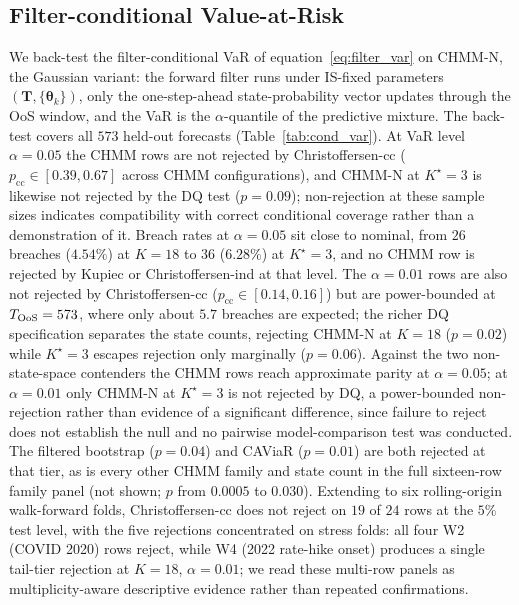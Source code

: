 \subsection{Filter-conditional Value-at-Risk}
\label{sec:res_var}

We back-test the filter-conditional VaR of equation~\eqref{eq:filter_var} on CHMM-N, the Gaussian variant: the forward filter runs under IS-fixed parameters $(\mathbf T, \{\boldsymbol\theta_k\})$, only the one-step-ahead state-probability vector updates through the OoS window, and the VaR is the $\alpha$-quantile of the predictive mixture. The back-test covers all $573$ held-out forecasts (Table~\ref{tab:cond_var}). At VaR level $\alpha = 0.05$ the CHMM rows are not rejected by Christoffersen-cc ($p_{\text{cc}} \in [0.39, 0.67]$ across CHMM configurations), and CHMM-N at $K^\star = 3$ is likewise not rejected by the DQ test ($p = 0.09$); non-rejection at these sample sizes indicates compatibility with correct conditional coverage rather than a demonstration of it. Breach rates at $\alpha = 0.05$ sit close to nominal, from $26$ breaches ($4.54\%$) at $K = 18$ to $36$ ($6.28\%$) at $K^\star = 3$, and no CHMM row is rejected by Kupiec or Christoffersen-ind at that level. The $\alpha = 0.01$ rows are also not rejected by Christoffersen-cc ($p_{\text{cc}} \in [0.14, 0.16]$) but are power-bounded at $T_{\text{OoS}} = 573$, where only about $5.7$ breaches are expected; the richer DQ specification separates the state counts, rejecting CHMM-N at $K = 18$ ($p = 0.02$) while $K^\star = 3$ escapes rejection only marginally ($p = 0.06$). Against the two non-state-space contenders the CHMM rows reach approximate parity at $\alpha = 0.05$; at $\alpha = 0.01$ only CHMM-N at $K^\star = 3$ is not rejected by DQ, a power-bounded non-rejection rather than evidence of a significant difference, since failure to reject does not establish the null and no pairwise model-comparison test was conducted. The filtered bootstrap ($p = 0.04$) and CAViaR ($p = 0.01$) are both rejected at that tier, as is every other CHMM family and state count in the full sixteen-row family panel (not shown; $p$ from $0.0005$ to $0.030$). Extending to six rolling-origin walk-forward folds, Christoffersen-cc does not reject on $19$ of $24$ rows at the $5\%$ test level, with the five rejections concentrated on stress folds: all four W2 (COVID 2020) rows reject, while W4 (2022 rate-hike onset) produces a single tail-tier rejection at $K = 18$, $\alpha = 0.01$; we read these multi-row panels as multiplicity-aware descriptive evidence rather than repeated confirmations.

